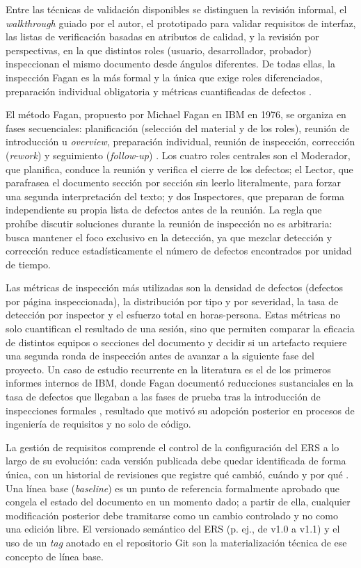 \documentclass[11pt,a4paper]{article}
\newcommand{\subseccion}[1]{%
  \vspace{0.35cm}
  \noindent{\color{uteqverde}\textbf{\large #1}}\par
  \vspace{0.15cm}
}
\begin{document}
Entre las técnicas de validación disponibles se distinguen la revisión informal,
el \textit{walkthrough} guiado por el autor, el prototipado para validar
requisitos de interfaz, las listas de verificación basadas en atributos de
calidad, y la revisión por perspectivas, en la que distintos roles (usuario,
desarrollador, probador) inspeccionan el mismo documento desde ángulos diferentes.
De todas ellas, la inspección Fagan es la más formal y la única que exige roles
diferenciados, preparación individual obligatoria y métricas cuantificadas de
defectos \cite{fagan1976}.

El método Fagan, propuesto por Michael Fagan en IBM en 1976, se organiza en fases
secuenciales: planificación (selección del material y de los roles), reunión de
introducción u \textit{overview}, preparación individual, reunión de inspección,
corrección (\textit{rework}) y seguimiento (\textit{follow-up}) \cite{fagan1976}.
Los cuatro roles centrales son el Moderador, que planifica, conduce la reunión y
verifica el cierre de los defectos; el Lector, que parafrasea el documento sección
por sección sin leerlo literalmente, para forzar una segunda interpretación del
texto; y dos Inspectores, que preparan de forma independiente su propia lista de
defectos antes de la reunión. La regla que prohíbe discutir soluciones durante la
reunión de inspección no es arbitraria: busca mantener el foco exclusivo en la
detección, ya que mezclar detección y corrección reduce estadísticamente el número
de defectos encontrados por unidad de tiempo.

Las métricas de inspección más utilizadas son la densidad de defectos (defectos
por página inspeccionada), la distribución por tipo y por severidad, la tasa de
detección por inspector y el esfuerzo total en horas-persona. Estas métricas no
solo cuantifican el resultado de una sesión, sino que permiten comparar la eficacia
de distintos equipos o secciones del documento y decidir si un artefacto requiere
una segunda ronda de inspección antes de avanzar a la siguiente fase del proyecto.
Un caso de estudio recurrente en la literatura es el de los primeros informes
internos de IBM, donde Fagan documentó reducciones sustanciales en la tasa de
defectos que llegaban a las fases de prueba tras la introducción de inspecciones
formales \cite{fagan1976}, resultado que motivó su adopción posterior en procesos
de ingeniería de requisitos y no solo de código.

\subseccion{3.3 Gestión de requisitos}

La gestión de requisitos comprende el control de la configuración del ERS a lo
largo de su evolución: cada versión publicada debe quedar identificada de forma
única, con un historial de revisiones que registre qué cambió, cuándo y por qué
\cite{ieee15288}. Una línea base (\textit{baseline}) es un punto de referencia
formalmente aprobado que congela el estado del documento en un momento dado; a
partir de ella, cualquier modificación posterior debe tramitarse como un cambio
controlado y no como una edición libre. El versionado semántico del ERS (p. ej.,
de v1.0 a v1.1) y el uso de un \textit{tag} anotado en el repositorio Git son la
materialización técnica de ese concepto de línea base.
\end{document}
